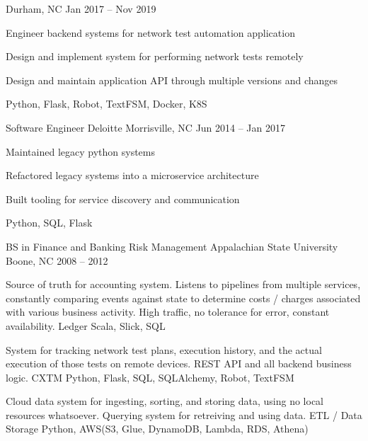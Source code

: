 \documentclass[]{awesome-cv}
\begin{document}
\begin{cventries}
	{Durham, NC}
	{Jan 2017 – Nov 2019}
	{\begin{cvitems}
		\item {Engineer backend systems for network test automation application}
		\item {Design and implement system for performing network tests remotely}
		\item {Design and maintain application API through multiple versions and changes}
		\item {Python, Flask, Robot, TextFSM, Docker, K8S}
		\end{cvitems}}
	\cventry
	{Software Engineer}
	{Deloitte}
	{Morrisville, NC}
	{Jun 2014 – Jan 2017}
	{\begin{cvitems}
		\item {Maintained legacy python systems}
		\item {Refactored legacy systems into a microservice architecture}
		\item {Built tooling for service discovery and communication}
		\item {Python, SQL, Flask}
		\end{cvitems}}
\end{cventries}
\begin{cventries}
	\cventry
	{BS in Finance and Banking \textbar{} Risk Management}
	{Appalachian State University}
	{Boone, NC}
	{2008 – 2012}
	{}
\end{cventries}

\vspace{-2mm}

\begin{cventries}
	\cventry
	{Source of truth for accounting system. Listens to pipelines from multiple services, constantly comparing events against state to determine costs / charges associated with various business activity. High traffic, no tolerance for error, constant availability.}
	{Ledger}
	{Scala, Slick, SQL}
	{}
	{}
	
	\vspace{-5mm}
	\cventry
	{System for tracking network test plans, execution history, and the actual execution of those tests on remote devices. REST API and all backend business logic.}
	{CXTM}
	{Python, Flask, SQL, SQLAlchemy, Robot, TextFSM}
	{}
	{}
	
	\vspace{-5mm}
	\cventry
	{Cloud data system for ingesting, sorting, and storing data, using no local resources whatsoever. Querying system for retreiving and using data.}
	{ETL / Data Storage}
	{Python, AWS(S3, Glue, DynamoDB, Lambda, RDS, Athena)}
	{}
	{}
	
	\vspace{-5mm}
\end{cventries}

\ 
\end{document}
